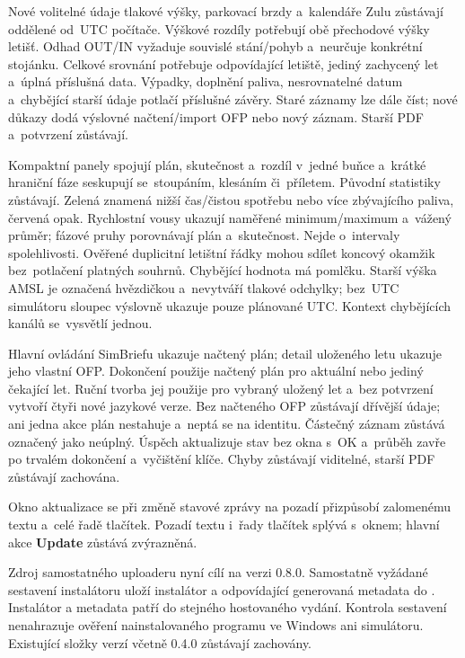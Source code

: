 \documentclass[11pt,a4paper]{article}
\newcommand{\filepath}[1]{\path{#1}}
\newcommand{\ui}[1]{\textbf{#1}}
\begin{document}
Nové volitelné údaje tlakové výšky, parkovací brzdy a~kalendáře Zulu zůstávají
oddělené od~UTC počítače. Výškové rozdíly potřebují obě přechodové výšky letišť.
Odhad OUT/IN vyžaduje souvislé stání/pohyb a~neurčuje konkrétní stojánku.
Celkové srovnání potřebuje odpovídající letiště, jediný zachycený let a~úplná
příslušná data. Výpadky, doplnění paliva, nesrovnatelné datum a~chybějící starší
údaje potlačí příslušné závěry. Staré záznamy lze dále číst; nové důkazy dodá
výslovné načtení/import OFP nebo nový záznam. Starší PDF a~potvrzení zůstávají.

Kompaktní panely spojují plán, skutečnost a~rozdíl v~jedné buňce a~krátké
hraniční fáze seskupují se~stoupáním, klesáním či~příletem. Původní statistiky
zůstávají. Zelená znamená nižší čas/čistou spotřebu nebo více zbývajícího
paliva,
červená opak. Rychlostní vousy ukazují naměřené minimum/maximum a~vážený průměr;
fázové pruhy porovnávají plán a~skutečnost. Nejde o~intervaly spolehlivosti.
Ověřené duplicitní letištní řádky mohou sdílet koncový okamžik bez~potlačení
platných souhrnů. Chybějící hodnota má pomlčku. Starší výška AMSL je označená
hvězdičkou a~nevytváří tlakové odchylky; bez~UTC simulátoru sloupec výslovně
ukazuje pouze plánované UTC. Kontext chybějících kanálů se~vysvětlí jednou.

Hlavní ovládání SimBriefu ukazuje načtený plán; detail uloženého letu ukazuje
jeho vlastní OFP. Dokončení použije načtený plán pro aktuální nebo jediný
čekající let. Ruční tvorba jej použije pro vybraný uložený let a~bez potvrzení
vytvoří čtyři nové jazykové verze. Bez načteného OFP zůstávají dřívější údaje;
ani jedna akce plán nestahuje a~neptá se na identitu. Částečný záznam zůstává
označený jako neúplný. Úspěch aktualizuje stav bez okna s~OK a~průběh zavře
po trvalém dokončení a~vyčištění klíče. Chyby zůstávají viditelné, starší PDF
zůstávají zachována.

Okno aktualizace se při změně stavové zprávy na pozadí přizpůsobí zalomenému
textu a~celé řadě tlačítek. Pozadí textu i~řady tlačítek splývá s~oknem;
hlavní akce \ui{Update} zůstává zvýrazněná.

Zdroj samostatného uploaderu nyní cílí na verzi 0.8.0. Samostatně vyžádané
sestavení instalátoru uloží instalátor a odpovídající generovaná metadata
\filepath{winapp-update.json} do \filepath{winapp/dist/0.8.0/}. Instalátor
a metadata patří do stejného hostovaného vydání. Kontrola sestavení nenahrazuje
ověření nainstalovaného programu ve Windows ani simulátoru. Existující složky
verzí včetně 0.4.0 zůstávají zachovány.
\end{document}
